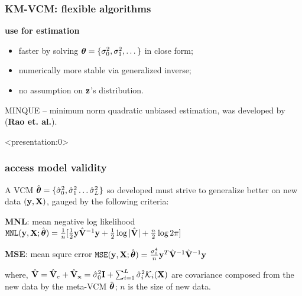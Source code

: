\documentclass{beamer}
\begin{document}
\begin{frame} %
  \frametitle{KM-VCM: flexible algorithms} %
  \textbf{use  for estimation}
  \begin{itemize}
  \item faster by solving $\boldsymbol{\theta}=\{\sigma_0^2, \sigma_1^2, \dots \}$
    in close form;
  \item numerically more stable via generalized inverse;
  \item no assumption on $\mathbf{z}$'s distribution.
  \end{itemize}
  MINQUE -- minimum norm quadratic unbiased estimation, was developed
  by (\textbf{Rao et. al.}).
\end{frame}
\begin{frame}<presentation:0>
  \frametitle{access model validity}
  A VCM
  $\hat{\boldsymbol{\theta}}=\{\hat{\sigma}^2_0, \hat{\sigma}^2_1 \dots
  \hat{\sigma}^2_L\}$ so developed must strive to generalize better on
  new data $(\mathbf{y}, \mathbf{X})$, gauged by the following criteria:
  \begin{block}{\textbf{MNL}: mean negative log likelihood}
    $\mathtt{MNL}(\mathbf{y}, \mathbf{X}; \hat{\boldsymbol{\theta}}) = \frac{1}{n}
    [\frac{1}{2}\mathbf{y}\hat{\mathbf{V}}^{-1}\mathbf{y} + \frac{1}{2}\log{|\hat{\mathbf{V}}|} +
    \frac{n}{2}\log{2\pi}]$
  \end{block}
  \begin{block}{\textbf{MSE}: mean squre error}
    $\mathtt{MSE}(\mathbf{y}, \mathbf{X}; \hat{\boldsymbol{\theta}}) = \frac{\sigma_0^4}{n}
    \mathbf{y}^T\hat{\mathbf{V}}^{-1} \hat{\mathbf{V}}^{-1}\mathbf{y}$
  \end{block}
  where,
  $\hat{\mathbf{V}} = \hat{\mathbf{V}}_e + \hat{\mathbf{V}}_\mathbf{x} = \hat{\sigma}^2_0\textbf{I} +
  \sum_{i=1}^L\hat{\sigma}_i^2 \mathcal{K}_i(\mathbf{X})$ are covariance
  composed from the new data by the meta-VCM $\hat{\boldsymbol{\theta}}$; $n$ is
  the size of new data.
\end{frame}
\end{document}
